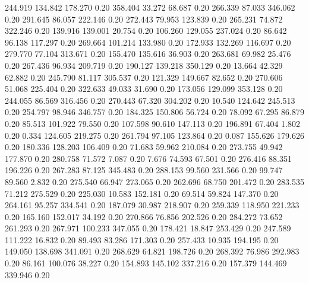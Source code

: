  244.919  134.842  178.270         0.20
 358.404   33.272   68.687         0.20
 266.339   87.033  346.062         0.20
 291.645   86.057  222.146         0.20
 272.443   79.953  123.839         0.20
 265.231   74.872  322.246         0.20
 139.916  139.001   20.754         0.20
 106.260  129.055  237.024         0.20
  86.642   96.138  117.297         0.20
 269.664  101.214  133.980         0.20
 172.933  132.269  116.697         0.20
 279.770   77.104  313.671         0.20
 155.470  135.616   36.903         0.20
 263.681   69.982   25.476         0.20
 267.436   96.934  209.719         0.20
 190.127  139.218  350.129         0.20
  13.664   42.329   62.882         0.20
 245.790   81.117  305.537         0.20
 121.329  149.667   82.652         0.20
 270.606   51.068  225.404         0.20
 322.633   49.033   31.690         0.20
 173.056  129.099  353.128         0.20
 244.055   86.569  316.456         0.20
 270.443   67.320  304.202         0.20
  10.540  124.642  245.513         0.20
 254.797   98.946  346.757         0.20
 184.325  150.806   56.724         0.20
  78.092   67.295   86.879         0.20
  85.513  101.922   79.550         0.20
 107.598   90.610  147.113         0.20
 196.891   67.404    1.802         0.20
   0.334  124.605  219.275         0.20
 261.794   97.105  123.864         0.20
   0.087  155.626  179.626         0.20
 180.336  128.203  106.409         0.20
  71.683   59.962  210.084         0.20
 273.755   49.942  177.870         0.20
 280.758   71.572    7.087         0.20
   7.676   74.593   67.501         0.20
 276.416   88.351  196.226         0.20
 267.283   87.125  345.483         0.20
 288.153   99.560  231.566         0.20
  99.747   89.560    2.832         0.20
 275.540   66.947  273.065         0.20
 262.696   68.750  201.472         0.20
 283.535   71.212  275.529         0.20
 225.030   10.583  152.181         0.20
  69.514   59.824  147.370         0.20
 264.161   95.257  334.541         0.20
 187.079   30.987  218.907         0.20
 259.339  118.950  221.233         0.20
 165.160  152.017   34.192         0.20
 270.866   76.856  202.526         0.20
 284.272   73.652  261.293         0.20
 267.971  100.233  347.055         0.20
 178.421   18.847  253.429         0.20
 247.589  111.222   16.832         0.20
  89.493   83.286  171.303         0.20
 257.433   10.935  194.195         0.20
 149.050  138.698  341.091         0.20
 268.629   64.821  198.726         0.20
 268.392   76.986  292.983         0.20
  86.161  100.076   38.227         0.20
 154.893  145.102  337.216         0.20
 157.379  144.469  339.946         0.20
